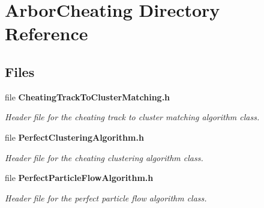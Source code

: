 \section{Arbor\+Cheating Directory Reference}
\label{dir_dcd9c91d101d0cb8932d637ce6c58ac5}
\subsection*{Files}
\begin{DoxyCompactItemize}
\item 
file {\bf Cheating\+Track\+To\+Cluster\+Matching.\+h}
\begin{DoxyCompactList}\small\item\em Header file for the cheating track to cluster matching algorithm class. \end{DoxyCompactList}\item 
file {\bf Perfect\+Clustering\+Algorithm.\+h}
\begin{DoxyCompactList}\small\item\em Header file for the cheating clustering algorithm class. \end{DoxyCompactList}\item 
file {\bf Perfect\+Particle\+Flow\+Algorithm.\+h}
\begin{DoxyCompactList}\small\item\em Header file for the perfect particle flow algorithm class. \end{DoxyCompactList}\end{DoxyCompactItemize}
